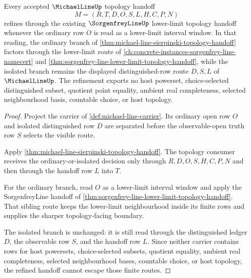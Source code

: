 \begin{theorem}
\label{thm:michael-line-sorgenfrey-handoff-refinement}
Every accepted $\MichaelLineUp$ topology handoff
$$
M=(R,T,D,O,S,L,H,C,P,N)
$$
refines through the existing $\SorgenfreyLineUp$ lower-limit topology handoff whenever the ordinary row $O$ is read as a lower-limit interval window. In that reading, the ordinary branch of \autoref{thm:michael-line-sierpinski-topology-handoff} factors through the lower-limit route of \autoref{ch:concrete-instances-sorgenfrey-line-namecert} and \autoref{thm:sorgenfrey-line-lower-limit-topology-handoff}, while the isolated branch remains the displayed distinguished-row route $D,S,L$ of $\MichaelLineUp$. The refinement exports no host powerset, choice-selected distinguished subset, quotient point equality, ambient real completeness, selected neighbourhood basis, countable choice, or host topology.
\end{theorem}
\begin{proof}
Project the carrier of \autoref{def:michael-line-carrier}. Its ordinary open row $O$ and isolated distinguished row $D$ are separated before the observable-open truth row $S$ selects the visible route.

Apply \autoref{thm:michael-line-sierpinski-topology-handoff}. The topology consumer receives the ordinary-or-isolated decision only through $R,D,O,S,H,C,P,N$ and then through the handoff row $L$ into $T$.

For the ordinary branch, read $O$ as a lower-limit interval window and apply the SorgenfreyLine handoff of \autoref{thm:sorgenfrey-line-lower-limit-topology-handoff}. That sibling route keeps the lower-limit neighbourhood inside its finite rows and supplies the sharper topology-facing boundary.

The isolated branch is unchanged: it is still read through the distinguished ledger $D$, the observable row $S$, and the handoff row $L$. Since neither carrier contains rows for host powersets, choice-selected subsets, quotient equality, ambient real completeness, selected neighbourhood bases, countable choice, or host topology, the refined handoff cannot escape those finite routes.
\end{proof}


